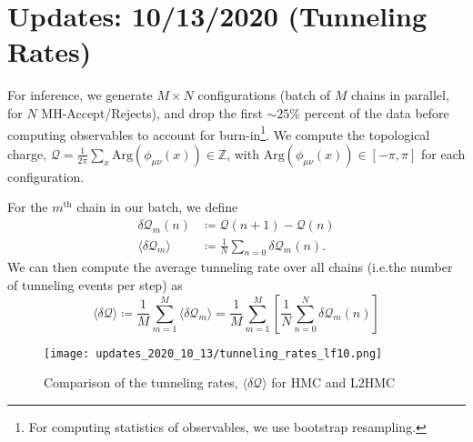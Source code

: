 %
\section{Updates: 10/13/2020 (Tunneling Rates)}%
\label{sec:updates_2020_10_13}
%
For inference, we generate \(M\times N\) configurations (batch of \(M\) chains in
parallel, for \(N\) MH-Accept/Rejects), and drop the first \(\sim 25\%\)
percent of the data before computing observables to account for
burn-in\footnote{For computing statistics of observables, we use bootstrap
resampling.}.
%
We compute the topological charge, \(\mathcal{Q} =
\frac{1}{2\pi}\sum_{x}\mathrm{Arg}\left(\phi_{\mu\nu}(x)\right) \in
\mathbb{Z}\), with \( \mathrm{Arg}\left(\phi_{\mu\nu}(x)\right) \in \left[-\pi,
\pi\right]\) for each configuration.
%

For the \(m^{\mathrm{th}}\) chain in our batch, we define 
%
\begin{align}
  \delta\mathcal{Q}_{m}(n) &\coloneqq \mathcal{Q}{(n+1)} - \mathcal{Q}{(n)}\\
  \langle\delta\mathcal{Q}_{m}\rangle &\coloneqq
  \frac{1}{N}\sum_{n=0}\delta\mathcal{Q}_{m}(n).
\end{align}
%
We can then compute the average tunneling rate over all chains (i.e.\@ the
number of tunneling events per step) as
%
\begin{equation}
  \langle \delta\mathcal{Q}\rangle%
  \coloneqq \frac{1}{M}\sum_{m=1}^{M}\langle\delta\mathcal{Q}_{m}\rangle
  =\frac{1}{M}\sum_{m=1}^{M}\left[\frac{1}{N}\sum_{n=0}^{N} \delta\mathcal{Q}_{m}(n)\right]
\end{equation}
%

\begin{figure}[htpb]
  \centering
  \texttt{[image: updates\_2020\_10\_13/tunneling\_rates\_lf10.png]}
  \caption{Comparison of the tunneling rates,
  \(\langle\delta\mathcal{Q}\rangle\) for HMC and L2HMC}
\end{figure}
%

